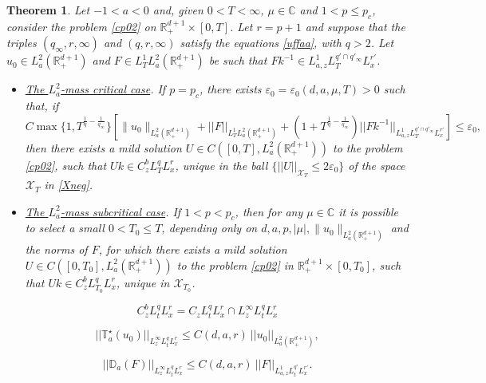 \documentclass[10pt,a4paper]{amsart}
\newtheorem{theorem}{Theorem}
\newcommand{\C}{\mathbb{C}}
\def \RN {\mathbb{R}_+^{d+1}}
\newcommand{\XT}{\mathcal{X}_T}
\newcommand{\ve}{\varepsilon}
\begin{document}
\begin{theorem}\label{T:nega}
Let $-1<a<0$ and, given $0<T<\infty$, $\mu\in \C$ and $1<p\le p_c$, consider the problem \eqref{cp02} on $\RN\times[0,T]$. Let $r = p+1$ and suppose that the triples $(q_\infty,r,\infty)$ and $(q,r,\infty)$ satisfy the equations \eqref{uffaa}, with $q>2$. Let $u_0\in L^2_a(\RN)$ and $F\in L^1_T L^2_a(\RN)$ be such that 
$F  k^{-1}\in L^1_{a,z} L^{q'\cap q'_\infty}_T L^{r'}_x $.
\begin{itemize}
\item[(1)] \underline{\emph{The $L^2_a$-mass critical case}}. 
If $p=p_c$, there exists $\ve_0 = \ve_0(d,a,\mu,T)>0$ such that, if   
\[
 C \max\{1,T^{\frac{1}{q}-\frac{1}{q_\infty}}\} \left[\|u_0\|_{L^2_a(\RN)} + ||F||_{L^1_T L^2_a(\RN)} + (1+T^{\frac{1}{q}-\frac{1}{q_\infty}}) ||F k^{-1}||_{L^1_{a,z} L^{q'\cap q'_\infty}_T L^{r'}_x}\right]\le \varepsilon_0,
\]
then there exists a mild solution $U\in C([0,T],L^2_a(\RN))$ to the problem \eqref{cp02}, such that $U k\in C^b_z L^q_T L^r_x$, unique in the ball $\{||U||_{\XT}\le 2\ve_0\}$ of the space $\XT$ in \eqref{Xneg}.
\item[(2)] \underline{\emph{The $L^2_a$-mass subcritical case}}. If $1<p<p_c$, then for any $\mu\in \C$ it is possible to select a small $0<T_0\le T$, depending only on $d, a, p, |\mu|, \|u_0\|_{L^2_a(\RN)}$ and the norms of $F$, for which there exists a mild solution $U\in C([0,T_0],L^2_a(\RN))$ to the problem \eqref{cp02} in $\RN\times [0,T_0]$, such that $U k\in C^b_z L^q_{T_0} L^r_x$, unique in $\mathcal X_{T_0}$.
\end{itemize}
\end{theorem}

\begin{equation}\label{Cz}
C^b_z L^q_t L^r_x =  C_z L^q_t L^r_x \cap L^\infty_z L^q_t L^r_x
\end{equation}

\begin{equation}\label{bulk00}
||\mathbb T^\star_a(u_0)||_{L^\infty_z L^q_t L^r_x } \le C(d,a,r)\ ||u_0||_{L^2_a(\RN)},
\end{equation}

\begin{equation}\label{Dabound}
||\mathbb D_a(F)||_{L^\infty_z L^q_t L^r_x } \le C(d,a,r)\  ||F||_{L^1_{a,z} L^{q'}_t L^{r'}_x }.
\end{equation}
\end{document}
